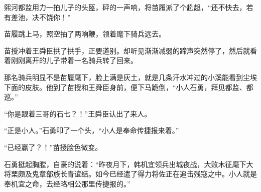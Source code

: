 熙河都监用力一拍儿子的头盔，砰的一声响，将苗履派了个趔趄，“还不快去，若有差池，决不饶你！”

苗履跳上马，照空抽了两响鞭，领着麾下骑兵远去。

苗授冲着王舜臣拱了拱手，正要道别。却听见渐渐减弱的蹄声突然停了，然后就看着刚刚离开的儿子带着一名骑兵转了回来。

那名骑兵明显不是苗履麾下，脸上满是灰土，就是几条汗水冲过的小溪能看到尘埃下面的皮肤。他到了苗授和王舜臣身前，便下马跪倒，“小人石勇，拜见都监、都巡。”

“你是跟着三哥的石七？！”王舜臣认出了来人。

“正是小人。”石勇叩了一个头，“小人是奉命传捷报来着。”

“已经赢了？！”苗授脸色微变。

石勇挺起胸膛，自豪的说着：“昨夜月下，韩机宜领兵出城夜战，大败木征麾下大将栗颇及鬼章部族长青谊结。如今已经遣了得力将佐正在追击残寇之中。小人就是奉机宜之命，去经略相公那里传捷报的。”

